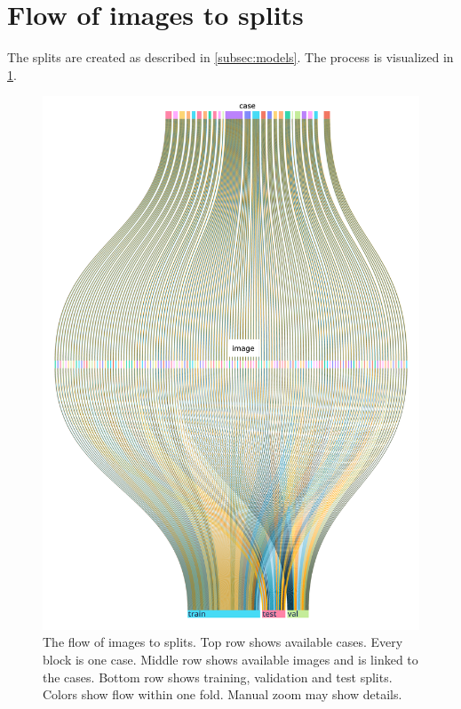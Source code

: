 \section{Flow of images to splits}\label{app:folds-splits-viz}
The splits are created as described in \cref{subsec:models}.
The process is visualized in \cref{fig:folds-splits-viz}.

\begin{figure}
    \centering
    \includegraphics[height=0.55\paperheight]{pediatric-brain-tumours/images/folds-splits-viz.pdf}
    \caption[Flow of images to splits]{
        The flow of images to splits.
        Top row shows available cases.
        Every block is one case.
        Middle row shows available images and is linked to the cases.
        Bottom row shows training, validation and test splits.
        Colors show flow within one fold.
        Manual zoom may show details.
    }
    \label{fig:folds-splits-viz}
\end{figure}

